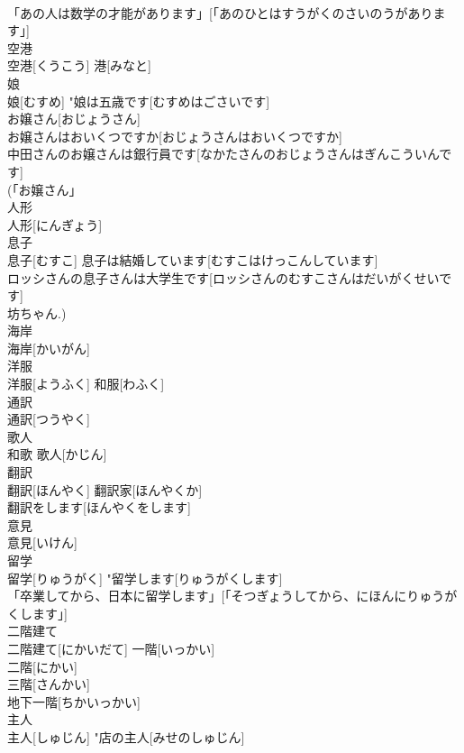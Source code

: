 \documentclass[8pt]{extreport}
\begin{document}
\begin{CJK}{UTF8}{min}
\\	「あの人は数学の才能があります」[「あのひとはすうがくのさいのうがあります」] 
\\	空港	
\\	空港[くうこう]	港[みなと] 
\\	娘	
\\	娘[むすめ]	"娘は五歳です[むすめはごさいです] 
\\	お嬢さん[おじょうさん] 
\\	お嬢さんはおいくつですか[おじょうさんはおいくつですか] 
\\	中田さんのお嬢さんは銀行員です[なかたさんのおじょうさんはぎんこういんです] 
\\	(「お嬢さん」 
\\	人形	
\\	人形[にんぎょう]	
\\	息子	
\\	息子[むすこ]	息子は結婚しています[むすこはけっこんしています] 
\\	ロッシさんの息子さんは大学生です[ロッシさんのむすこさんはだいがくせいです] 
\\	坊ちゃん.)
\\	海岸	
\\	海岸[かいがん]	
\\	洋服	
\\	洋服[ようふく]	和服[わふく] 
\\	通訳	
\\	通訳[つうやく]	
\\	歌人	
\\	和歌	歌人[かじん]	
\\	翻訳	
\\	翻訳[ほんやく]	翻訳家[ほんやくか] 
\\	翻訳をします[ほんやくをします] 
\\	意見	
\\	意見[いけん]	
\\	留学	
\\	留学[りゅうがく]	"留学します[りゅうがくします] 
\\	「卒業してから、日本に留学します」[「そつぎょうしてから、にほんにりゅうがくします」] 
\\	二階建て	
\\	二階建て[にかいだて]	一階[いっかい] 
\\	二階[にかい] 
\\	三階[さんかい] 
\\	地下一階[ちかいっかい] 
\\	主人	
\\	主人[しゅじん]	"店の主人[みせのしゅじん] 

\end{CJK}
\end{document}
